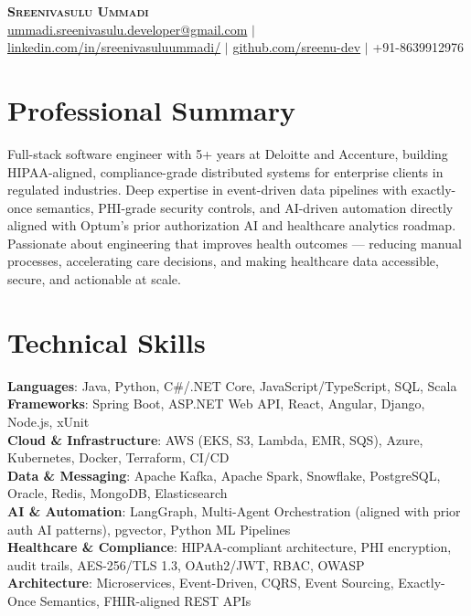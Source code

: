 \documentclass[letterpaper,11pt]{article}
\begin{document}
\begin{center}
    \textbf{\Huge \scshape Sreenivasulu Ummadi} \\ \vspace{5pt}
    \small \href{mailto:ummadi.sreenivasulu.developer@gmail.com}{ummadi.sreenivasulu.developer@gmail.com} $|$
    \href{https://www.linkedin.com/in/sreenivasuluummadi/}{linkedin.com/in/sreenivasuluummadi/} $|$
    \href{https://github.com/sreenu-dev}{github.com/sreenu-dev} $|$
    \small +91-8639912976
\end{center}

\section{Professional Summary}
\small{Full-stack software engineer with 5+ years at Deloitte and Accenture, building HIPAA-aligned, compliance-grade distributed systems for enterprise clients in regulated industries. Deep expertise in event-driven data pipelines with exactly-once semantics, PHI-grade security controls, and AI-driven automation directly aligned with Optum's prior authorization AI and healthcare analytics roadmap. Passionate about engineering that improves health outcomes — reducing manual processes, accelerating care decisions, and making healthcare data accessible, secure, and actionable at scale.}

\section{Technical Skills}
 \begin{itemize}[leftmargin=0.15in, label={}]
    \small{\item{
     \textbf{Languages}{: Java, Python, C\#/.NET Core, JavaScript/TypeScript, SQL, Scala} \\
     \textbf{Frameworks}{: Spring Boot, ASP.NET Web API, React, Angular, Django, Node.js, xUnit} \\
     \textbf{Cloud \& Infrastructure}{: AWS (EKS, S3, Lambda, EMR, SQS), Azure, Kubernetes, Docker, Terraform, CI/CD} \\
     \textbf{Data \& Messaging}{: Apache Kafka, Apache Spark, Snowflake, PostgreSQL, Oracle, Redis, MongoDB, Elasticsearch} \\
     \textbf{AI \& Automation}{: LangGraph, Multi-Agent Orchestration (aligned with prior auth AI patterns), pgvector, Python ML Pipelines} \\
     \textbf{Healthcare \& Compliance}{: HIPAA-compliant architecture, PHI encryption, audit trails, AES-256/TLS 1.3, OAuth2/JWT, RBAC, OWASP} \\
     \textbf{Architecture}{: Microservices, Event-Driven, CQRS, Event Sourcing, Exactly-Once Semantics, FHIR-aligned REST APIs}
    }}
 \end{itemize}
\end{document}

